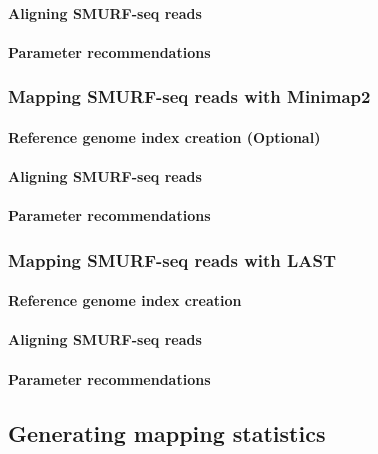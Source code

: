 \documentclass[11pt]{article}
\begin{document}
\paragraph{Aligning SMURF-seq reads}

\paragraph{Parameter recommendations}


\subsubsection{Mapping SMURF-seq reads with Minimap2}
\label{minimap}
\paragraph{Reference genome index creation (Optional)}

\paragraph{Aligning SMURF-seq reads}

\paragraph{Parameter recommendations}



\subsubsection{Mapping SMURF-seq reads with LAST}
\label{last}
\paragraph{Reference genome index creation}

\paragraph{Aligning SMURF-seq reads}

\paragraph{Parameter recommendations}


\subsection{Generating mapping statistics}
\end{document}
